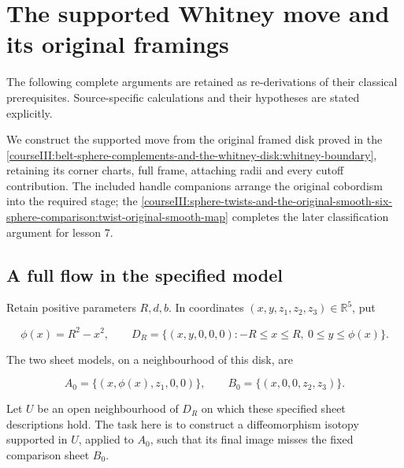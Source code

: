 \section{The supported Whitney move and its original framings}\label{courseIII:whitney-move-with-controlled-support:section}

The following complete arguments are retained as re-derivations of their classical prerequisites. Source-specific calculations and their hypotheses are stated explicitly.

We construct the supported move from the original framed disk proved in the \cref{courseIII:belt-sphere-complements-and-the-whitney-disk:whitney-boundary}, retaining its corner charts, full frame, attaching radii and every cutoff contribution. The included handle companions arrange the original cobordism into the required stage; the \cref{courseIII:sphere-twists-and-the-original-smooth-six-sphere-comparison:twist-original-smooth-map} completes the later classification argument for lesson 7.

\subsection{A full flow in the specified model}
\label{courseIII:whitney-move-with-controlled-support:move-model-flow}

\label{courseIII:whitney-move-with-controlled-support:section-1}\label{courseIII:whitney-support:1}

Retain positive parameters \(R,d,b\). In coordinates
\((x,y,z_1,z_2,z_3)\in\mathbb R^5\), put

\begin{equation}
\phi(x)=R^2-x^2,\qquad
D_R=\{(x,y,0,0,0):-R\leq x\leq R,\ 0\leq y\leq\phi(x)\}.
\label{courseIII:whitney-move-with-controlled-support:eq:1.1}
\end{equation}

The two sheet models, on a neighbourhood of this disk, are

\begin{equation}
A_0=\{(x,\phi(x),z_1,0,0)\},\qquad
B_0=\{(x,0,0,z_2,z_3)\}.
\label{courseIII:whitney-move-with-controlled-support:eq:1.2}
\end{equation}

Let \(U\) be an open neighbourhood of \(D_R\) on which these specified sheet descriptions hold. The task here is to construct a diffeomorphism isotopy supported in \(U\), applied to \(A_0\), such that its final image misses the fixed comparison sheet \(B_0\).

